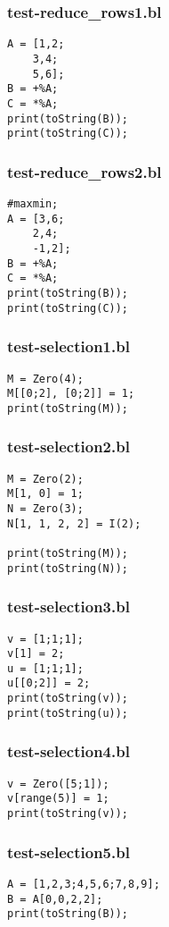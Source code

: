 \subsubsection{test-reduce\_rows1.bl}
\begin{lstlisting}
A = [1,2;
    3,4;
    5,6];
B = +%A;
C = *%A;
print(toString(B));
print(toString(C));\end{lstlisting}
\subsubsection{test-reduce\_rows2.bl}
\begin{lstlisting}
#maxmin;
A = [3,6;
    2,4;
    -1,2];
B = +%A;
C = *%A;
print(toString(B));
print(toString(C));
\end{lstlisting}
\subsubsection{test-selection1.bl}
\begin{lstlisting}
M = Zero(4);
M[[0;2], [0;2]] = 1;
print(toString(M));\end{lstlisting}
\subsubsection{test-selection2.bl}
\begin{lstlisting}
M = Zero(2);
M[1, 0] = 1;
N = Zero(3);
N[1, 1, 2, 2] = I(2);

print(toString(M));
print(toString(N));\end{lstlisting}
\subsubsection{test-selection3.bl}
\begin{lstlisting}
v = [1;1;1];
v[1] = 2;
u = [1;1;1];
u[[0;2]] = 2;
print(toString(v));
print(toString(u));\end{lstlisting}
\subsubsection{test-selection4.bl}
\begin{lstlisting}
v = Zero([5;1]);
v[range(5)] = 1;
print(toString(v));
\end{lstlisting}
\subsubsection{test-selection5.bl}
\begin{lstlisting}
A = [1,2,3;4,5,6;7,8,9];
B = A[0,0,2,2];
print(toString(B));\end{lstlisting}
